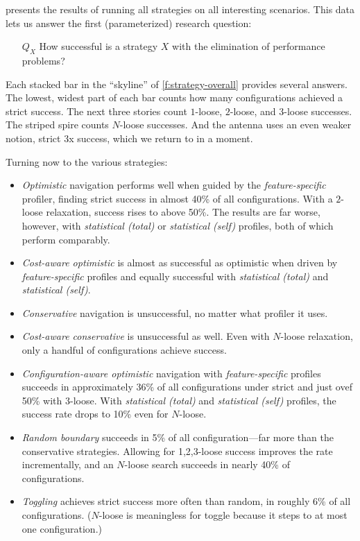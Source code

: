  presents the results of running all strategies on all
interesting scenarios.
This data lets us answer the first (parameterized) research question:

\begin{itemize}
  \item[$Q_X$] How successful is a strategy $X$ with the elimination of
    performance problems?
\end{itemize}

Each stacked bar in the ``skyline'' of \cref{f:strategy-overall} provides
several answers.
The lowest, widest part of each bar counts how many configurations
achieved a strict success.
The next three stories count $1$-loose, $2$-loose, and $3$-loose successes.
The striped spire counts $N$-loose successes.
And the antenna uses an even weaker notion, strict 3x success, which we return
to in a moment.

Turning now to the various strategies:
\begin{itemize}
  \item
    \emph{Optimistic} navigation performs well when guided by the \emph{feature-specific} profiler,
    finding strict success in almost 40\% of all configurations.
    With a $2$-loose relaxation, success rises to above 50\%.
    The results are far worse, however, with \emph{statistical (total)} or \emph{statistical (self)}
    profiles, both of which perform comparably.

  \item
    \emph{Cost-aware optimistic} is almost as successful as optimistic when driven
    by \emph{feature-specific} profiles and equally successful with \emph{statistical (total)}
    and \emph{statistical (self)}.

  \item
    \emph{Conservative} navigation is unsuccessful, no matter what profiler it uses.

  \item
    \emph{Cost-aware conservative} is unsuccessful as well.
    Even with $N$-loose relaxation, only a handful of configurations achieve success.

  \item
    \emph{Configuration-aware optimistic} navigation with
    \emph{feature-specific} profiles succeeds in approximately 36\% of all
    configurations under strict and just ovef 50\% with $3$-loose.
    With \emph{statistical (total)} and \emph{statistical (self)} profiles,
    the success rate drops to 10\% even for $N$-loose.

  \item
    \emph{Random boundary} succeeds in 5\% of all configuration---far more than the conservative strategies.
    Allowing for 1,2,3-loose success improves the rate incrementally, and an $N$-loose search
    succeeds in nearly 40\% of configurations.

  \item
    \emph{Toggling} achieves strict success more often than random, in roughly 6\% of all configurations.
    ($N$-loose is meaningless for toggle because it steps to at most one configuration.)
\end{itemize}

